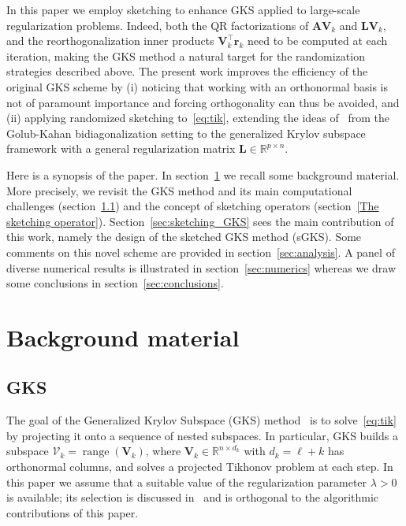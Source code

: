 \documentclass[%
  a4paper,
  onecolumn,
  colorlinks,
]{preprint}
\theoremstyle{plain}
\theoremstyle{definition}
\newcommand{\R}{\ensuremath{\mathbb{R}}}
\newcommand{\range}{\operatorname{range}}
\newcommand{\bA}{\ensuremath{\boldsymbol{A}}}
\newcommand{\bL}{\ensuremath{\boldsymbol{L}}}
\newcommand{\bV}{\ensuremath{\boldsymbol{V}}}
\newcommand{\br}{\mathbf{r}}
\begin{document}
In this paper we employ sketching to enhance 
GKS applied to large-scale regularization problems.
Indeed, both the QR factorizations of $\bA\bV_k$ and $\bL\bV_k$, and the
reorthogonalization inner products $\bV_k^\top \br_k$ need to be computed at each iteration, making the GKS method a natural target
for the randomization strategies described above.
The present work improves the efficiency of the original GKS scheme by (i) noticing that working with an orthonormal basis is not of paramount importance and forcing orthogonality can thus be avoided, and (ii) applying randomized sketching to~\eqref{eq:tik},
extending the ideas of~\cite{ChungGazzola25} from the Golub-Kahan
bidiagonalization setting to the generalized Krylov subspace framework with a
general regularization matrix $\bL \in \R^{p \times n}$.

Here is a synopsis of the paper. In section~\ref{sec:background} we recall some background material. More precisely, we revisit the GKS method and its main computational challenges (section~\ref{sec:GKS}) and the concept of sketching operators (section~\ref{The sketching operator}). Section~\ref{sec:sketching_GKS} sees the main contribution of this work, namely the design of the sketched GKS method (sGKS). Some comments on this novel scheme are provided in section~\ref{sec:analysis}. A panel of diverse numerical results is illustrated in section~\ref{sec:numerics} whereas we draw some conclusions in section~\ref{sec:conclusions}.


\section{Background material}\label{sec:background}


\subsection{GKS}\label{sec:GKS}

The goal of the Generalized Krylov Subspace (GKS) method~\cite{LRV12} is to solve~\eqref{eq:tik} by projecting it onto a sequence of nested subspaces. In particular, GKS
builds a subspace
$\mathcal{V}_k = \range(\bV_k)$, where $\bV_k \in \R^{n \times d_k}$ with
$d_k = \ell + k $ has orthonormal columns, and solves a projected Tikhonov problem at each step. In this paper we assume that a suitable value of the regularization parameter
$\lambda > 0$ is available; its selection is discussed
in~\cite{LRV12} and is orthogonal to the algorithmic
contributions of this paper.
\end{document}
